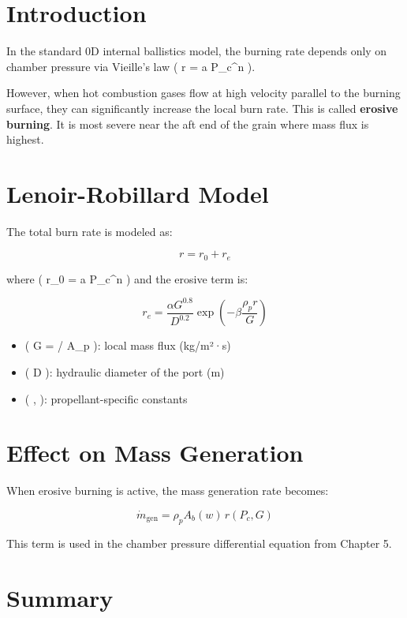 \documentclass[
  letterpaper,
  DIV=11,
  numbers=noendperiod]{scrreprt}
\providecommand{\tightlist}{%
  \setlength{\itemsep}{0pt}\setlength{\parskip}{0pt}}
\begin{document}
\section{Introduction}\label{introduction-4}

In the standard 0D internal ballistics model, the burning rate depends
only on chamber pressure via Vieille's law ( r = a P\_c\^{}n ).

However, when hot combustion gases flow at high velocity parallel to the
burning surface, they can significantly increase the local burn rate.
This is called \textbf{erosive burning}. It is most severe near the aft
end of the grain where mass flux is highest.

\section{Lenoir-Robillard Model}\label{lenoir-robillard-model}

The total burn rate is modeled as:

\[
r = r_0 + r_e
\]

where ( r\_0 = a P\_c\^{}n ) and the erosive term is:

\[
r_e = \frac{\alpha G^{0.8}}{D^{0.2}} \exp\left( -\beta \frac{\rho_p r}{G} \right)
\]

\begin{itemize}
\tightlist
\item
  ( G =  / A\_p ): local mass flux (kg/m²·s)
\item
  ( D ): hydraulic diameter of the port (m)
\item
  ( \alpha, \beta ): propellant-specific constants
\end{itemize}

\section{Effect on Mass Generation}\label{effect-on-mass-generation}

When erosive burning is active, the mass generation rate becomes:

\[
\dot{m}_\text{gen} = \rho_p A_b(w) \, r(P_c, G)
\]

This term is used in the chamber pressure differential equation from
Chapter 5.

\section{Summary}\label{summary-2}
\end{document}
